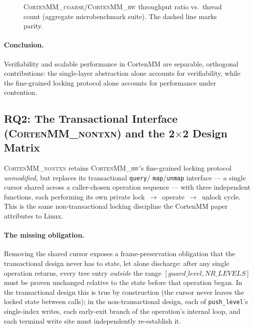 \documentclass[10pt]{article}
\newcommand{\corten}[1]{\textsc{CortenMM\_#1}}
\begin{document}
\begin{figure}[h]
\centering
{}
\caption{\corten{coarse}/\corten{rw} throughput ratio vs.\ thread count
(aggregate microbenchmark suite). The dashed line marks parity.}
\label{fig:gap1-perf}
\end{figure}

\paragraph{Conclusion.} Verifiability and scalable performance in
CortenMM are separable, orthogonal contributions: the single-layer
abstraction alone accounts for verifiability, while the fine-grained
locking protocol alone accounts for performance under contention.

\subsection{RQ2: The Transactional Interface (\corten{nontxn}) and the
2$\times$2 Design Matrix}
\label{sec:eval:gap4}

\corten{nontxn} retains \corten{rw}'s fine-grained locking protocol
\emph{unmodified}, but replaces its transactional \texttt{query}/
\texttt{map}/\texttt{unmap} interface --- a single cursor shared across
a caller-chosen operation sequence --- with three independent functions,
each performing its own private lock~$\to$~operate~$\to$~unlock cycle.
This is the same non-transactional locking discipline the CortenMM paper
attributes to Linux.

\paragraph{The missing obligation.} Removing the shared cursor exposes a
frame-preservation obligation that the transactional design never has to
state, let alone discharge: after any single operation returns, every
tree entry \emph{outside} the range $[\mathit{guard\_level},
\mathit{NR\_LEVELS}]$ must be proven unchanged relative to the state
before that operation began. In the transactional design this is true by
construction (the cursor never leaves the locked state between calls);
in the non-transactional design, each of \texttt{push\_level}'s
single-index writes, each early-exit branch of the operation's internal
loop, and each terminal write site must independently re-establish it.
\end{document}

